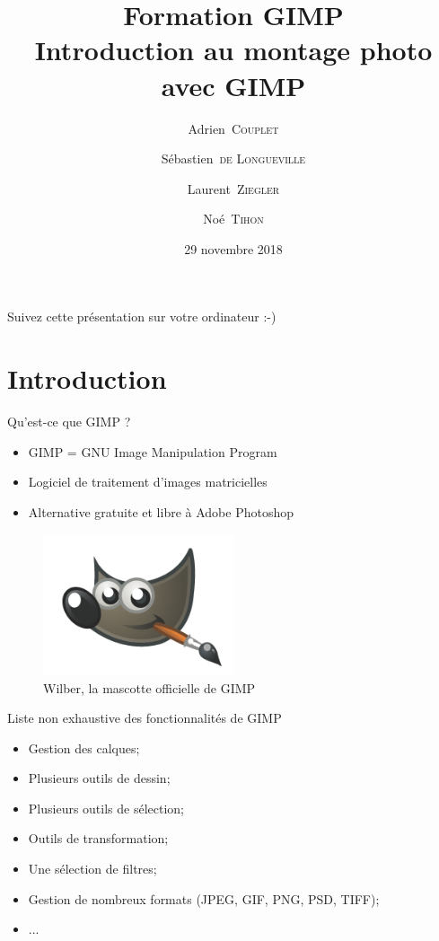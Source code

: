 \documentclass[10pt,svgnames,usenames,table]{beamer}
\institute{Louvain-li-Nux}
\title{\textbf{Formation GIMP}\\
Introduction au montage photo avec GIMP}
\author{Adrien~\textsc{Couplet} \and Sébastien~\textsc{de Longueville} \and Laurent~\textsc{Ziegler} \and Noé~\textsc{Tihon} }
\date{29 novembre 2018}
\begin{document}
\begin{frame}
	\maketitle
\end{frame}

\begin{frame}
  \begin{center}\Large
  Suivez cette présentation sur votre ordinateur :-)
  
  \vspace{1cm}
  \end{center}
\end{frame}

\section{Introduction}
\begin{frame}[allowframebreaks]{Qu'est-ce que GIMP ?}
	\begin{itemize}
	    \item GIMP = GNU Image Manipulation Program
	    \item Logiciel de traitement d'images matricielles
	    \item Alternative gratuite et libre à Adobe Photoshop
	\end{itemize}
	\begin{figure}
	    \centering
	    \includegraphics[width=0.5\textwidth]{Images/gimp-logo}
	    \caption{Wilber, la mascotte officielle de GIMP} 
	\end{figure}
	\framebreak
	Liste non exhaustive des fonctionnalités de GIMP
	\begin{itemize}
	    \item Gestion des calques;
	    \item Plusieurs outils de dessin;
	    \item Plusieurs outils de sélection;
	    \item Outils de transformation;
	    \item Une sélection de filtres;
	    \item Gestion de nombreux formats (JPEG, GIF, PNG, PSD, TIFF);
	    \item ...
	\end{itemize}
\end{frame}
\end{document}
